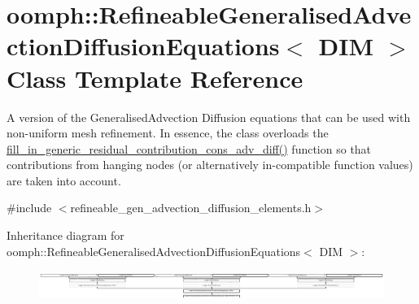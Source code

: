\hypertarget{classoomph_1_1RefineableGeneralisedAdvectionDiffusionEquations}{}\section{oomph\+:\+:Refineable\+Generalised\+Advection\+Diffusion\+Equations$<$ D\+IM $>$ Class Template Reference}
\label{classoomph_1_1RefineableGeneralisedAdvectionDiffusionEquations}


A version of the Generalised\+Advection Diffusion equations that can be used with non-\/uniform mesh refinement. In essence, the class overloads the \hyperlink{classoomph_1_1RefineableGeneralisedAdvectionDiffusionEquations_abd0535533c7133651ac18ad8e025f139}{fill\+\_\+in\+\_\+generic\+\_\+residual\+\_\+contribution\+\_\+cons\+\_\+adv\+\_\+diff()} function so that contributions from hanging nodes (or alternatively in-\/compatible function values) are taken into account.  




{\ttfamily \#include $<$refineable\+\_\+gen\+\_\+advection\+\_\+diffusion\+\_\+elements.\+h$>$}

Inheritance diagram for oomph\+:\+:Refineable\+Generalised\+Advection\+Diffusion\+Equations$<$ D\+IM $>$\+:\begin{figure}[H]
\begin{center}
\leavevmode
\includegraphics[height=0.980392cm]{classoomph_1_1RefineableGeneralisedAdvectionDiffusionEquations}
\end{center}
\end{figure}
